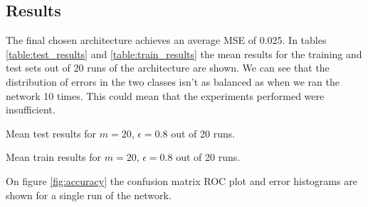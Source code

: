 \documentclass[a4paper, 11pt]{article}
\begin{document}
\subsection{Results}
The final chosen architecture achieves an average MSE of 0.025. In tables \ref{table:test_results} and \ref{table:train_results} the mean results for the training and test sets out of 20 runs of the architecture are shown. We can see that the distribution of errors in the two classes isn't as balanced as when we ran the network 10 times. This could mean that the experiments performed were insufficient. 
\begin{table}[h!]
\caption{Mean test results for $m=20$, $\epsilon=0.8$ out of 20 runs.}
\label{table:test_results}
\end{table}

\begin{table}[h!]
\caption{Mean train results for $m=20$, $\epsilon=0.8$ out of 20 runs.}
\label{table:train_results}
\end{table}

On figure \ref{fig:accuracy} the confusion matrix ROC plot and error histograms are shown for a single run of the network.
\end{document}
